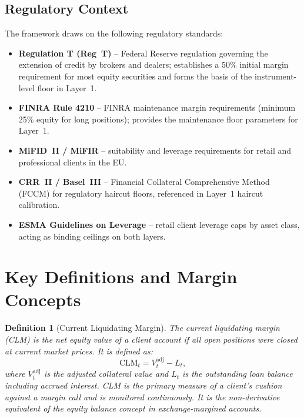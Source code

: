 \documentclass[12pt, a4paper]{article}
\newtheorem{definition}{Definition}[section]
\begin{document}
\subsection{Regulatory Context}
The framework draws on the following regulatory standards:
\begin{itemize}[leftmargin=1.5em]
    \item \textbf{Regulation T (Reg~T)} -- Federal Reserve regulation
    governing the extension of credit by brokers and dealers; establishes
    a 50\% initial margin requirement for most equity securities and forms
    the basis of the instrument-level floor in Layer~1.
    \item \textbf{FINRA Rule 4210} -- FINRA maintenance margin requirements
    (minimum 25\% equity for long positions); provides the maintenance
    floor parameters for Layer~1.
    \item \textbf{MiFID~II / MiFIR} -- suitability and leverage requirements
    for retail and professional clients in the EU.
    \item \textbf{CRR~II / Basel~III} -- Financial Collateral Comprehensive
    Method (FCCM) for regulatory haircut floors, referenced in Layer~1
    haircut calibration.
    \item \textbf{ESMA Guidelines on Leverage} -- retail client leverage
    caps by asset class, acting as binding ceilings on both layers.
\end{itemize}

\section{Key Definitions and Margin Concepts}
\label{sec:definitions}

\begin{definition}[Current Liquidating Margin]
The \emph{current liquidating margin} (CLM) is the net equity value of a
client account if all open positions were closed at current market prices.
It is defined as:
\[
\mathrm{CLM}_t = V_t^{\mathrm{adj}} - L_t,
\]
where $V_t^{\mathrm{adj}}$ is the adjusted collateral value and $L_t$ is
the outstanding loan balance including accrued interest. CLM is the primary
measure of a client's cushion against a margin call and is monitored
continuously. It is the non-derivative equivalent of the equity balance
concept in exchange-margined accounts.
\end{definition}
\end{document}
